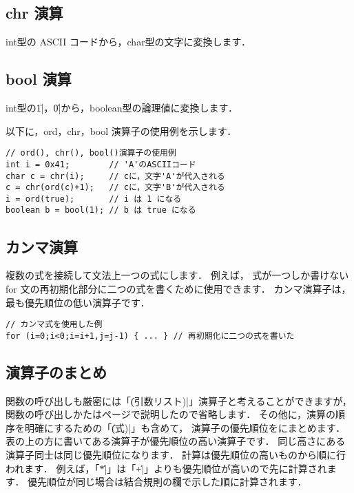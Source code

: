 \subsection{chr 演算}
\label{chap3:chr}

int型の ASCII コードから，char型の文字に変換します．

\subsection{bool 演算}
\label{chap3:bool}

int型の\|1|，\|0|から，boolean型の論理値に変換します．

以下に，ord，chr，bool 演算子の使用例を示します．

\begin{mylist}
\begin{verbatim}
// ord(), chr(), bool()演算子の使用例
int i = 0x41;        // 'A'のASCIIコード
char c = chr(i);     // cに，文字'A'が代入される
c = chr(ord(c)+1);   // cに，文字'B'が代入される
i = ord(true);       // i は 1 になる
boolean b = bool(1); // b は true になる
\end{verbatim}
\end{mylist}

\subsection{カンマ演算}
複数の式を接続して文法上一つの式にします．
例えば，
式が一つしか書けない for 文の再初期化部分に二つの式を書くために使用できます．
カンマ演算子は，最も優先順位の低い演算子です．

\begin{mylist}
\begin{verbatim}
// カンマ式を使用した例
for (i=0;i<0;i=i+1,j=j-1) { ... } // 再初期化に二つの式を書いた
\end{verbatim}
\end{mylist}

\subsection{演算子のまとめ}

関数の呼び出しも厳密には「\|(引数リスト)|」演算子と考えることができますが，
関数の呼び出しかたは\pageref{chap3:func}ページで説明したので省略します．
その他に，演算の順序を明確にするための「\|(式)|」も含めて，
演算子の優先順位をにまとめます．
表の上の方に書いてある演算子が優先順位の高い演算子です．
同じ高さにある演算子同士は同じ優先順位になります．
計算は優先順位の高いものから順に行われます．
例えば，「\|*|」は「\|+|」よりも優先順位が高いので先に計算されます．
優先順位が同じ場合は結合規則の欄で示した順に計算されます．

